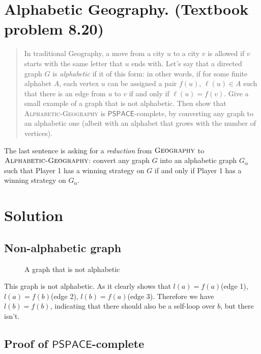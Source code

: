 

\maketitle
\thispagestyle{firststyle}
\vspace{-2.0cm}

\section{Alphabetic Geography. (Textbook problem 8.20)}
\begin{quote}
    In traditional Geography, a move from a city $u$ to a city $v$ is allowed if $v$ starts with the same letter that $u$ ends with.
    Let’s say that a directed graph $G$ is \emph{alphabetic} if it of this form:
    in other words, if for some finite alphabet $A$,
    each vertex $u$ can be assigned a pair $f(u)$, $\ell(u) \in A$
    such that there is an edge from $u$ to $v$
    if and only if $\ell(u) = f(v)$.
    Give a small example of a graph that is not alphabetic.
    Then show that \textsc{Alphabetic-Geography} is $\mathsf{PSPACE}$-complete,
    by converting any graph to an alphabetic one
    (albeit with an alphabet that grows with the number of vertices).
\end{quote}
The last sentence is asking for a \emph{reduction} from $\textsc{Geography}$ to $\textsc{Alphabetic-Geography}$:
convert any graph $G$ into an alphabetic graph $G_\alpha$ such that
Player 1 has a winning strategy on $G$
if and only if
Player 1 has a winning strategy on $G_\alpha$.

\section*{Solution}

\subsection*{Non-alphabetic graph}

\begin{figure}[h]
    \centering
    \caption{A graph that is not alphabetic}
\end{figure}

This graph is not alphabetic.
As it clearly shows that $l(a) = f(a)$(edge 1), $l(a) = f(b)$(edge 2), $l(b) = f(a)$(edge 3).
Therefore we have $l(b) = f(b)$, indicating that there should also be a self-loop over $b$, but there isn't.

\subsection*{Proof of $\mathsf{PSPACE}$-complete}


